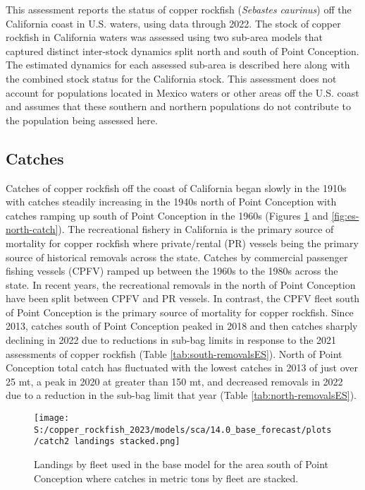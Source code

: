 \documentclass[11pt,
  english,
  letterpaper,
]{article}
\begin{document}
This assessment reports the status of copper rockfish (\emph{Sebastes caurinus}) off the California coast in U.S. waters, using data through 2022. The stock of copper rockfish in California waters was assessed using two sub-area models that captured distinct inter-stock dynamics split north and south of Point Conception. The estimated dynamics for each assessed sub-area is described here along with the combined stock status for the California stock. This assessment does not account for populations located in Mexico waters or other areas off the U.S. coast and assumes that these southern and northern populations do not contribute to the population being assessed here.

\hypertarget{catches}{%
\subsection*{Catches}\label{catches}}

Catches of copper rockfish off the coast of California began slowly in the 1910s with catches steadily increasing in the 1940s north of Point Conception with catches ramping up south of Point Conception in the 1960s (Figures \ref{fig:es-south-catch} and \ref{fig:es-north-catch}). The recreational fishery in California is the primary source of mortality for copper rockfish where private/rental (PR) vessels being the primary source of historical removals across the state. Catches by commercial passenger fishing vessels (CPFV) ramped up between the 1960s to the 1980s across the state. In recent years, the recreational removals in the north of Point Conception have been split between CPFV and PR vessels. In contrast, the CPFV fleet south of Point Conception is the primary source of mortality for copper rockfish. Since 2013, catches south of Point Conception peaked in 2018 and then catches sharply declining in 2022 due to reductions in sub-bag limits in response to the 2021 assessments of copper rockfish (Table \ref{tab:south-removalsES}). North of Point Conception total catch has fluctuated with the lowest catches in 2013 of just over 25 mt, a peak in 2020 at greater than 150 mt, and decreased removals in 2022 due to a reduction in the sub-bag limit that year (Table \ref{tab:north-removalsES}).





\begin{figure}
\centering
\texttt{[image: S:/copper\_rockfish\_2023/models/sca/14.0\_base\_forecast/plots/catch2 landings stacked.png]}
\caption{Landings by fleet used in the base model for the area south of Point Conception where catches in metric tons by fleet are stacked.\label{fig:es-south-catch}}
\end{figure}
\end{document}
